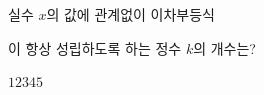 \hspace*{2mm}\begin{minipage}[t]{\dimexpr\linewidth-2mm\relax}\vspace{0pt}
실수 $x$의 값에 관계없이 이차부등식\par\smallskip{}\par\smallskip\noindent 이 항상 성립하도록 하는 정수 $k$의 개수는?
\begin{choices32}{$1$}{$2$}{$3$}{$4$}{$5$}\end{choices32}\end{minipage}
